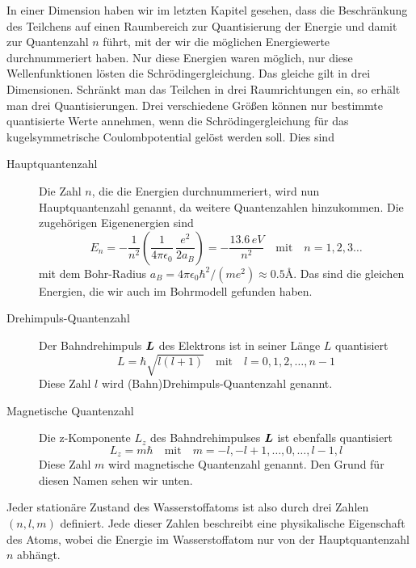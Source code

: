 In einer Dimension haben wir im letzten Kapitel gesehen, dass die Beschränkung des Teilchens auf einen Raumbereich zur Quantisierung der Energie und damit zur Quantenzahl $n$ führt, mit der wir die möglichen Energiewerte durchnummeriert haben. Nur diese Energien waren möglich, nur diese Wellenfunktionen lösten die Schrödingergleichung. Das gleiche gilt in drei Dimensionen. Schränkt man das Teilchen in drei Raumrichtungen ein, so erhält man drei Quantisierungen. Drei verschiedene Größen können nur bestimmte quantisierte Werte annehmen, wenn die Schrödingergleichung für das kugelsymmetrische Coulombpotential gelöst werden soll. Dies sind
\begin{description}
    \item[Hauptquantenzahl] Die Zahl $n$, die die Energien durchnummeriert, wird nun Hauptquantenzahl genannt, da weitere Quantenzahlen hinzukommen. Die zugehörigen Eigenenergien sind
 \begin{equation}
E_n = - \frac{1}{n^2} \left( \frac{1}{4 \pi \epsilon_0} \, \frac{e^2}{2 a_B }\right) = - \frac{13.6 \, eV}{n^2} \quad \text{mit} \quad n = 1,2, 3 \dots       
    \end{equation}
    mit dem Bohr-Radius $a_B = 4 \pi \epsilon_0 \hbar^2 / (m e^2) \approx 0.5$\AA. Das sind die gleichen Energien, die wir auch im Bohrmodell gefunden haben.

    \item[Drehimpuls-Quantenzahl] Der Bahndrehimpuls $\boldsymbol{L}$ des Elektrons ist in seiner Länge $L$ quantisiert
    \begin{equation}
        L = \hbar \sqrt{l (l+1) }  \quad \text{mit} \quad l = 0, 1,2, \dots , n-1
    \end{equation}
Diese Zahl $l$ wird (Bahn)Drehimpuls-Quantenzahl genannt.

\item[Magnetische Quantenzahl] Die z-Komponente $L_z$ des Bahndrehimpulses $\boldsymbol{L}$ ist ebenfalls quantisiert 
\begin{equation}
    L_z = m \hbar   \quad \text{mit} \quad m = -l, -l+1, \dots, 0, \dots, l-1, l
\end{equation}
Diese Zahl $m$ wird magnetische Quantenzahl genannt. Den Grund für diesen Namen sehen wir unten.

\end{description}
Jeder stationäre Zustand des Wasserstoffatoms ist also durch drei Zahlen $(n,l,m)$ definiert. Jede dieser Zahlen beschreibt eine physikalische Eigenschaft des Atoms, wobei die Energie im Wasserstoffatom nur von der Hauptquantenzahl $n$ abhängt.

